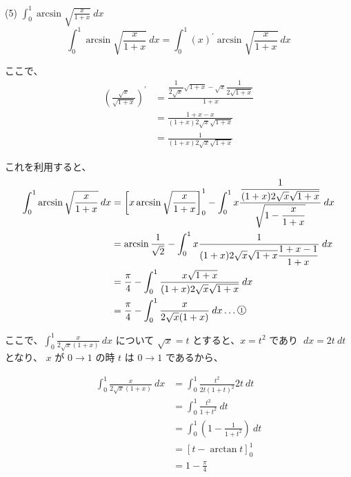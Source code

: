 \documentclass[a4j]{jsarticle}
\newcommand{\ctext}[1]{\raise0.2ex\hbox{\textcircled{\scriptsize{#1}}}} %
\begin{document}
    (5) $\displaystyle \int_{0}^{1} \arcsin \sqrt{\frac{x}{1 + x}}  \: dx$ \\

    \begin{equation*}
        \int_{0}^{1} \arcsin \sqrt{\frac{x}{1 + x}}  \: dx = \int_{0}^{1} (x)^{\prime} \arcsin \sqrt{\frac{x}{1 + x}}  \: dx
    \end{equation*}

    ここで、
    \begin{align*}
        \left(\frac{\sqrt{x}}{\sqrt{1 + x}}\right)^{\prime} &= \frac{\dfrac{1}{2\sqrt{x}}\sqrt{1 + x} - \sqrt{x}\dfrac{1}{2\sqrt{1 + x}}}{1 + x} \\
        &= \frac{1 + x - x}{(1 + x)2 \sqrt{x}\sqrt{1 + x}} \\
        &= \frac{1}{(1 + x)2\sqrt{x}\sqrt{1 + x}}
    \end{align*}

    これを利用すると、
    \begin{align*}
        \int_{0}^{1} \arcsin \sqrt{\frac{x}{1 + x}}  \: dx &= \left[x \arcsin \sqrt{\dfrac{x}{1 + x}}\right]_{0}^{1} - \int_{0}^{1} x \frac{\dfrac{1}{(1 + x)2\sqrt{x}\sqrt{1 + x}}}{\sqrt{1 - \dfrac{x}{1 + x}}}  \: dx \\
        &= \arcsin \frac{1}{\sqrt{2}} - \int_0^1 x \frac{1}{(1 + x)2 \sqrt{x} \sqrt{1 + x} \dfrac{1 + x - 1}{1 + x}}  \: dx \\
        &= \frac{\pi}{4} - \int_{0}^{1} \frac{x \sqrt{1 + x}}{(1 + x)2 \sqrt{x} \sqrt{1 + x}}  \: dx \\
        &= \frac{\pi}{4} - \int_{0}^{1} \frac{x}{2 \sqrt{x} (1 + x)}  \: dx \dots \ctext{1}
    \end{align*}

    ここで、$\displaystyle \int_{0}^{1} \frac{x}{2 \sqrt{x} (1 + x)}  \: dx$ について $\displaystyle \sqrt{x} = t$ とすると、$x = t^2$ であり $ \: dx = 2t\: dt$ となり、
    $x$ が $0 \rightarrow 1$ の時 $t$ は $0 \rightarrow 1$ であるから、

    \begin{align*}
        \int_{0}^{1} \frac{x}{2 \sqrt{x} (1 + x)}  \: dx &= \int_{0}^{1} \frac{t^2}{2t(1 + t)^2}2t\: dt \\
        &= \int_{0}^{1} \frac{t^2}{1 + t^2} \: dt \\
        &= \int_{0}^{1} \left(1 - \frac{1}{1 + t^2}\right) \: dt \\
        &= \left[t - \arctan t\right]_{0}^{1} \\
        &= 1 - \frac{\pi}{4}
    \end{align*}
\end{document}
